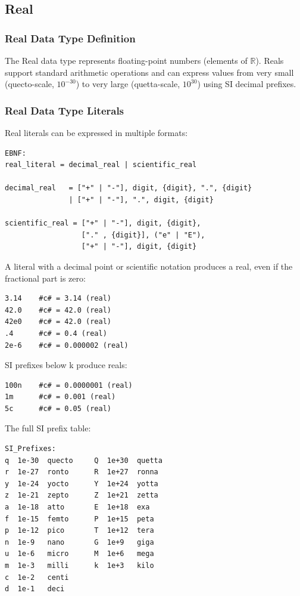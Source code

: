 \documentclass{report}
\begin{document}
\subsection{Real}
\subsubsection{Real Data Type Definition}
The Real data type represents floating-point numbers (elements of $\mathbb{R}$). Reals support standard arithmetic operations and can express values from very small (quecto-scale, $10^{-30}$) to very large (quetta-scale, $10^{30}$) using SI decimal prefixes.
\subsubsection{Real Data Type Literals}
Real literals can be expressed in multiple formats:
\begin{verbatim}
EBNF:
real_literal = decimal_real | scientific_real

decimal_real   = ["+" | "-"], digit, {digit}, ".", {digit}
               | ["+" | "-"], ".", digit, {digit}

scientific_real = ["+" | "-"], digit, {digit}, 
                  ["." , {digit}], ("e" | "E"), 
                  ["+" | "-"], digit, {digit}
\end{verbatim}

A literal with a decimal point or scientific notation produces a real, even if the fractional part is zero:
\begin{verbatim}
3.14    #c# = 3.14 (real)
42.0    #c# = 42.0 (real)
42e0    #c# = 42.0 (real)
.4      #c# = 0.4 (real)
2e-6    #c# = 0.000002 (real)
\end{verbatim}

SI prefixes below k produce reals:
\begin{verbatim}
100n    #c# = 0.0000001 (real)
1m      #c# = 0.001 (real)
5c      #c# = 0.05 (real)
\end{verbatim}

The full SI prefix table:
\begin{verbatim}
SI_Prefixes:
q  1e-30  quecto     Q  1e+30  quetta
r  1e-27  ronto      R  1e+27  ronna
y  1e-24  yocto      Y  1e+24  yotta
z  1e-21  zepto      Z  1e+21  zetta
a  1e-18  atto       E  1e+18  exa
f  1e-15  femto      P  1e+15  peta
p  1e-12  pico       T  1e+12  tera
n  1e-9   nano       G  1e+9   giga
u  1e-6   micro      M  1e+6   mega
m  1e-3   milli      k  1e+3   kilo
c  1e-2   centi
d  1e-1   deci
\end{verbatim}
\end{document}
